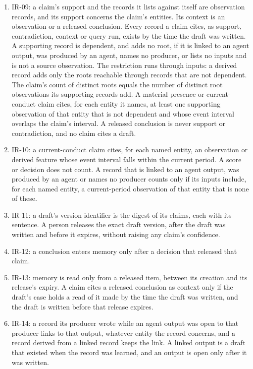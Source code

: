 \documentclass[
  11pt,
]{article}
\begin{document}
\begin{enumerate}
  bear on that interval, does not count for or against the claim.
\item
  \mbox{IR-09}: a claim's support and the records it lists against
  itself are observation records, and its support concerns the claim's
  entities. Its context is an observation or a released conclusion.
  Every record a claim cites, as support, contradiction, context or
  query run, exists by the time the draft was written. A supporting
  record is dependent, and adds no root, if it is linked to an agent
  output, was produced by an agent, names no producer, or lists no
  inputs and is not a source observation. The restriction runs through
  inputs: a derived record adds only the roots reachable through records
  that are not dependent. The claim's count of distinct roots equals the
  number of distinct root observations its supporting records add. A
  material presence or current-conduct claim cites, for each entity it
  names, at least one supporting observation of that entity that is not
  dependent and whose event interval overlaps the claim's interval. A
  released conclusion is never support or contradiction, and no claim
  cites a draft.
\item
  \mbox{IR-10}: a current-conduct claim cites, for each named entity, an
  observation or derived feature whose event interval falls within the
  current period. A score or decision does not count. A record that is
  linked to an agent output, was produced by an agent or names no
  producer counts only if its inputs include, for each named entity, a
  current-period observation of that entity that is none of these.
\item
  \mbox{IR-11}: a draft's version identifier is the digest of its
  claims, each with its sentence. A person releases the exact draft
  version, after the draft was written and before it expires, without
  raising any claim's confidence.
\item
  \mbox{IR-12}: a conclusion enters memory only after a decision that
  released that claim.
\item
  \mbox{IR-13}: memory is read only from a released item, between its
  creation and its release's expiry. A claim cites a released conclusion
  as context only if the draft's case holds a read of it made by the
  time the draft was written, and the draft is written before that
  release expires.
\item
  \mbox{IR-14}: a record its producer wrote while an agent output was
  open to that producer links to that output, whatever entity the record
  concerns, and a record derived from a linked record keeps the link. A
  linked output is a draft that existed when the record was learned, and
  an output is open only after it was written.
\end{enumerate}
\end{document}
